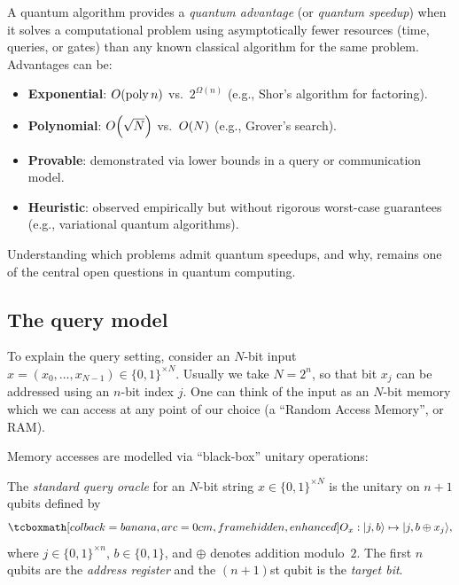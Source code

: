 \begin{intuition}
  A quantum algorithm provides a \emph{quantum advantage} (or
  \emph{quantum speedup}) when it solves a computational problem using
  asymptotically fewer resources (time, queries, or gates) than any known
  classical algorithm for the same problem.  Advantages can be:
  \begin{itemize}
    \item \textbf{Exponential}: $O\!\left(\operatorname{poly}{n}\right)$ vs.\ $2^{\Omega(n)}$
      (e.g., Shor's algorithm for factoring).
    \item \textbf{Polynomial}: $O\!\left(\sqrt{N}\right)$ vs.\ $O\!\left(N\right)$
      (e.g., Grover's search).
    \item \textbf{Provable}: demonstrated via lower bounds in a query or
      communication model.
    \item \textbf{Heuristic}: observed empirically but without rigorous
      worst-case guarantees (e.g., variational quantum algorithms).
  \end{itemize}
  Understanding which problems admit quantum speedups, and why, remains one
  of the central open questions in quantum computing.
\end{intuition}

\subsection{The query model}\label{subsec:query-model}

To explain the query setting, consider an $N$-bit input
$x = (x_0, \ldots , x_{N-1}) \in \{0, 1\}^{\times N}$.  Usually we take
$N=2^n$, so that bit $x_j$ can be addressed using an $n$-bit index $j$.
One can think of the input as an $N$-bit memory which we can access at any
point of our choice (a ``Random Access Memory'', or RAM).

Memory accesses are modelled via ``black-box'' unitary operations:

\begin{definition}\label{def:standard-oracle}
  The \emph{standard query oracle} for an $N$-bit string
  $x\in\{0,1\}^{\times N}$ is the unitary on $n+1$ qubits defined by
  \begin{equation}
    \eqbox{\Ox:\ket{j,b} \mapsto \ket{j,b\oplus x_j},}
  \end{equation}
  where $j\in \{0,1\}^{\times n}$, $b\in \{0,1\}$, and $\oplus$ denotes
  addition modulo~$2$.  The first $n$ qubits are the \emph{address register}
  and the $(n+1)$st qubit is the \emph{target bit}.
\end{definition}

